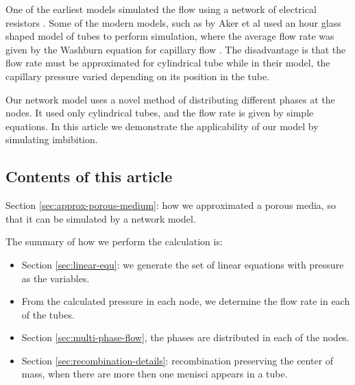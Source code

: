 	One of the earliest models simulated the flow using a network of electrical resistors \cite{fatt1956network}. Some of the modern models, such as by Aker et al \cite{aker1998two} used an hour glass shaped model of tubes  to perform simulation, where the average flow rate was given by the Washburn equation for capillary flow \cite{washburn1921dynamics}. The disadvantage is that the flow rate must be approximated for cylindrical tube while in their model, the capillary pressure varied depending on its position in the tube.
	
	Our network model uses a novel method of distributing different phases at the nodes. It used only cylindrical tubes, and the flow rate is given by simple equations. In this article we demonstrate the applicability of our model by simulating imbibition.
	
\subsection{Contents of this article}
	Section \ref{sec:approx-porous-medium}: how we approximated a porous media, so that it can be simulated by a network model.
	
	The summary of how we perform the calculation is:
	\begin{itemize}
		\item Section \ref{sec:linear-equ}: we generate the set of linear equations with pressure as the variables.
		\item From the calculated pressure in each node, we determine the flow rate in each of the tubes.
		\item Section \ref{sec:multi-phase-flow}, the phases are distributed in each of the nodes.
		\item Section \ref{sec:recombination-details}: recombination preserving the center of mass, when there are more then one menisci appears in a tube.
	\end{itemize}
	
	
	

	
	
